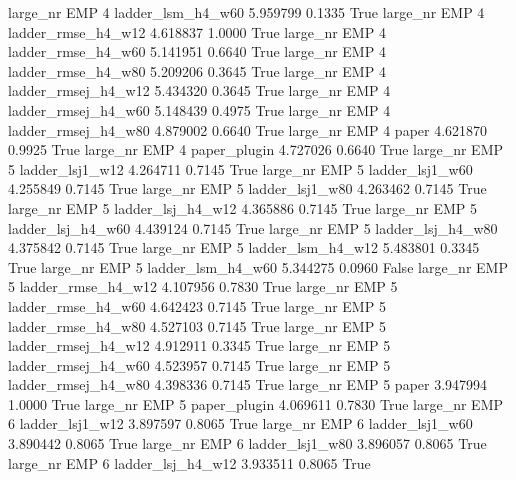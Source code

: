   large_nr      EMP                 4   ladder_lsm_h4_w60    5.959799      0.1335    True
  large_nr      EMP                 4  ladder_rmse_h4_w12    4.618837      1.0000    True
  large_nr      EMP                 4  ladder_rmse_h4_w60    5.141951      0.6640    True
  large_nr      EMP                 4  ladder_rmse_h4_w80    5.209206      0.3645    True
  large_nr      EMP                 4 ladder_rmsej_h4_w12    5.434320      0.3645    True
  large_nr      EMP                 4 ladder_rmsej_h4_w60    5.148439      0.4975    True
  large_nr      EMP                 4 ladder_rmsej_h4_w80    4.879002      0.6640    True
  large_nr      EMP                 4               paper    4.621870      0.9925    True
  large_nr      EMP                 4        paper_plugin    4.727026      0.6640    True
  large_nr      EMP                 5     ladder_lsj1_w12    4.264711      0.7145    True
  large_nr      EMP                 5     ladder_lsj1_w60    4.255849      0.7145    True
  large_nr      EMP                 5     ladder_lsj1_w80    4.263462      0.7145    True
  large_nr      EMP                 5   ladder_lsj_h4_w12    4.365886      0.7145    True
  large_nr      EMP                 5   ladder_lsj_h4_w60    4.439124      0.7145    True
  large_nr      EMP                 5   ladder_lsj_h4_w80    4.375842      0.7145    True
  large_nr      EMP                 5   ladder_lsm_h4_w12    5.483801      0.3345    True
  large_nr      EMP                 5   ladder_lsm_h4_w60    5.344275      0.0960   False
  large_nr      EMP                 5  ladder_rmse_h4_w12    4.107956      0.7830    True
  large_nr      EMP                 5  ladder_rmse_h4_w60    4.642423      0.7145    True
  large_nr      EMP                 5  ladder_rmse_h4_w80    4.527103      0.7145    True
  large_nr      EMP                 5 ladder_rmsej_h4_w12    4.912911      0.3345    True
  large_nr      EMP                 5 ladder_rmsej_h4_w60    4.523957      0.7145    True
  large_nr      EMP                 5 ladder_rmsej_h4_w80    4.398336      0.7145    True
  large_nr      EMP                 5               paper    3.947994      1.0000    True
  large_nr      EMP                 5        paper_plugin    4.069611      0.7830    True
  large_nr      EMP                 6     ladder_lsj1_w12    3.897597      0.8065    True
  large_nr      EMP                 6     ladder_lsj1_w60    3.890442      0.8065    True
  large_nr      EMP                 6     ladder_lsj1_w80    3.896057      0.8065    True
  large_nr      EMP                 6   ladder_lsj_h4_w12    3.933511      0.8065    True
